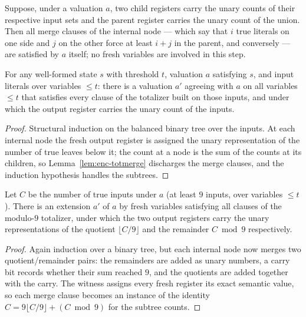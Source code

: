 \begin{lemma}\label{lem:enc-totmerge}
Suppose, under a valuation $a$, two child registers carry the unary counts of
their respective input sets and the parent register carries the unary count
of the union.  Then all merge clauses of the internal node --- which say that
$i$ true literals on one side and $j$ on the other force at least $i + j$ in
the parent, and conversely --- are satisfied by $a$ itself; no fresh
variables are involved in this step.
\leanok
{}
\end{lemma}

\begin{proposition}\label{prop:enc-totalizer}
For any well-formed state $s$ with threshold $t$, valuation $a$ satisfying
$s$, and input literals over variables $\leq t$: there is a valuation $a'$
agreeing with $a$ on all variables $\leq t$ that satisfies every clause of
the totalizer built on those inputs, and under which the output register
carries the unary count of the inputs.
\leanok
{}
\end{proposition}

\begin{proof}\leanok
Structural induction on the balanced binary tree over the inputs.  At each
internal node the fresh output register is assigned the unary representation
of the number of true leaves below it; the count at a node is the sum of the
counts at its children, so Lemma~\ref{lem:enc-totmerge} discharges the merge
clauses, and the induction hypothesis handles the subtrees.
\end{proof}

\begin{proposition}\label{prop:enc-mto}
Let $C$ be the number of true inputs under $a$ (at least $9$ inputs, over
variables $\leq t$).  There is an extension $a'$ of $a$ by fresh variables
satisfying all clauses of the modulo-$9$ totalizer, under which the two
output registers carry the unary representations of the quotient
$\lfloor C/9 \rfloor$ and the remainder $C \bmod 9$ respectively.
\leanok
{}
\end{proposition}

\begin{proof}\leanok
Again induction over a binary tree, but each internal node now merges two
quotient/remainder pairs: the remainders are added as unary numbers, a carry
bit records whether their sum reached $9$, and the quotients are added
together with the carry.  The witness assigns every fresh register its exact
semantic value, so each merge clause becomes an instance of the identity
$C = 9\lfloor C/9\rfloor + (C \bmod 9)$ for the subtree counts.
\end{proof}

